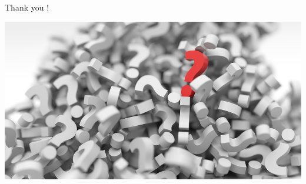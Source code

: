 \documentclass{beamer}
\begin{document}
\begin{frame}{Thank you !}

	\includegraphics[width=\textwidth]{Figures/Questions}

\end{frame}
\end{document}
